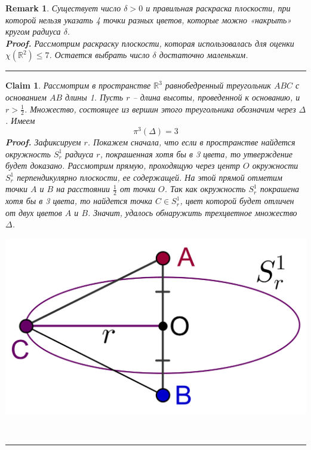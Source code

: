 \documentclass{report}%
\newtheorem{claim}[theorem]{Claim}
\newtheorem{remark}[theorem]{Remark}
\newenvironment{proof}[1][Proof]{\textbf{#1.} }{\ \rule{0.5em}{0.5em}}
\begin{document}
\begin{remark}
		Существует число $\delta > 0$ и правильная раскраска плоскости,
		при которой нельзя указать 4 точки разных цветов, которые можно «накрыть» кругом радиуса $\delta$. \\
		\begin{proof}
				Рассмотрим раскраску плоскости, которая использовалась для оценки $\chi(\mathbb{R}^2) \leq 7$.
				Остается выбрать число $\delta$ достаточно маленьким. 
		\end{proof}
\end{remark}

\begin{claim}
		Рассмотрим в пространстве $\mathbb{R}^3$ равнобедренный треугольник $ABC$ с основанием $AB$ длины 1.
		Пусть $r$ – длина высоты, проведенной к основанию, и $r > \frac{1}{2}$.
		Множество, состоящее из вершин этого треугольника обозначим через $\Delta$. Имеем
		\begin{equation}
				\pi^3(\Delta) = 3
		\end{equation}
		\begin{proof}
				Зафиксируем $r$. Покажем сначала, что если в пространстве найдется окружность
				$S_r^1$ радиуса $r$, покрашенная хотя бы в 3 цвета, то утверждение будет доказано.
				Рассмотрим прямую, проходящую через центр $O$ окружности $S_r^1$ перпендикулярно плоскости, ее содержащей.
				На этой прямой отметим точки $A$ и $B$ на расстоянии $\frac{1}{2}$ от точки $O$.
				Так как окружность $S_r^1$ покрашена хотя бы в 3 цвета,
				то найдется точка $C \in S_r^1$, цвет которой будет отличен от двух цветов  $A$ и $B$.
				Значит, удалось обнаружить трехцветное множество $\Delta$. \\
				\begin{center}
						\includegraphics[scale = 0.5]{my_claim3}
				\end{center}
				

\end{proof}
\end{claim}
\end{document}
